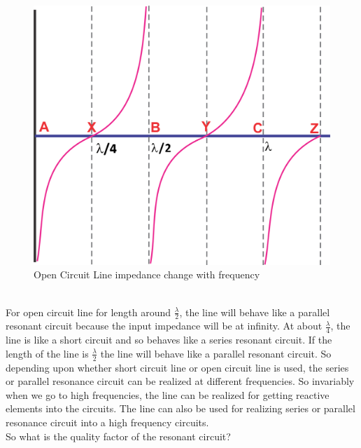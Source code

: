 \begin{figure}[h]
\centering
\includegraphics[scale=0.4]{./graphics/group10diagram14}
\caption{Open Circuit Line impedance change with frequency}
\end{figure}\\For open circuit line for length around $ \frac{\lambda}{2} $, the line will behave like a parallel resonant circuit because the input impedance will be at infinity. At about $ \frac{\lambda}{4} $, the line is like a short circuit and so behaves like a series resonant circuit. If the length of the line is $ \frac{\lambda}{2} $ the line will behave like a parallel resonant circuit.
So depending upon whether short circuit line or open circuit line is used, the series or parallel resonance circuit can be realized at different frequencies. So invariably when we go to high frequencies, the line can be realized for getting reactive elements into the circuits. The line can also be used for realizing series or parallel resonance circuit into a high frequency circuits.\\
So what is the quality factor of the resonant circuit?

